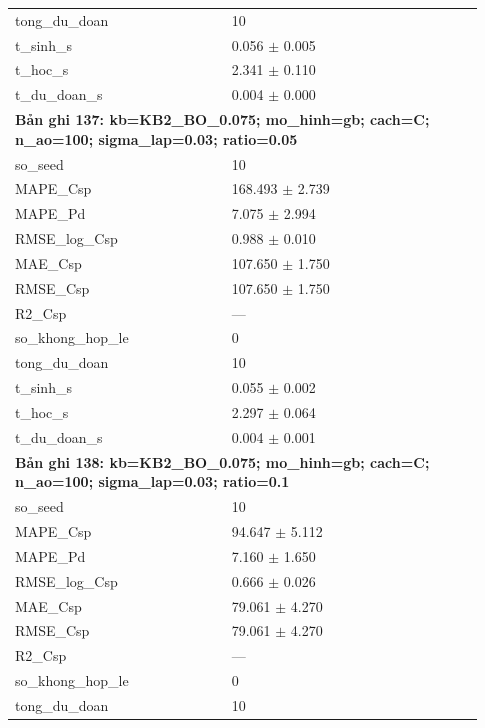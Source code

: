\begin{longtable}{p{0.43\linewidth}p{0.50\linewidth}}
tong\_\allowbreak du\_\allowbreak doan & 10 \\
t\_\allowbreak sinh\_\allowbreak s & 0.056 $\pm$ 0.005 \\
t\_\allowbreak hoc\_\allowbreak s & 2.341 $\pm$ 0.110 \\
t\_\allowbreak du\_\allowbreak doan\_\allowbreak s & 0.004 $\pm$ 0.000 \\
\midrule
\multicolumn{2}{p{0.95\linewidth}}{\textbf{Bản ghi 137: kb=KB2\_BO\_0.075; mo\_hinh=gb; cach=C; n\_ao=100; sigma\_lap=0.03; ratio=0.05}} \\
so\_\allowbreak seed & 10 \\
MAPE\_\allowbreak Csp & 168.493 $\pm$ 2.739 \\
MAPE\_\allowbreak Pd & 7.075 $\pm$ 2.994 \\
RMSE\_\allowbreak log\_\allowbreak Csp & 0.988 $\pm$ 0.010 \\
MAE\_\allowbreak Csp & 107.650 $\pm$ 1.750 \\
RMSE\_\allowbreak Csp & 107.650 $\pm$ 1.750 \\
R2\_\allowbreak Csp & — \\
so\_\allowbreak khong\_\allowbreak hop\_\allowbreak le & 0 \\
tong\_\allowbreak du\_\allowbreak doan & 10 \\
t\_\allowbreak sinh\_\allowbreak s & 0.055 $\pm$ 0.002 \\
t\_\allowbreak hoc\_\allowbreak s & 2.297 $\pm$ 0.064 \\
t\_\allowbreak du\_\allowbreak doan\_\allowbreak s & 0.004 $\pm$ 0.001 \\
\midrule
\multicolumn{2}{p{0.95\linewidth}}{\textbf{Bản ghi 138: kb=KB2\_BO\_0.075; mo\_hinh=gb; cach=C; n\_ao=100; sigma\_lap=0.03; ratio=0.1}} \\
so\_\allowbreak seed & 10 \\
MAPE\_\allowbreak Csp & 94.647 $\pm$ 5.112 \\
MAPE\_\allowbreak Pd & 7.160 $\pm$ 1.650 \\
RMSE\_\allowbreak log\_\allowbreak Csp & 0.666 $\pm$ 0.026 \\
MAE\_\allowbreak Csp & 79.061 $\pm$ 4.270 \\
RMSE\_\allowbreak Csp & 79.061 $\pm$ 4.270 \\
R2\_\allowbreak Csp & — \\
so\_\allowbreak khong\_\allowbreak hop\_\allowbreak le & 0 \\
tong\_\allowbreak du\_\allowbreak doan & 10 \\

\end{longtable}
